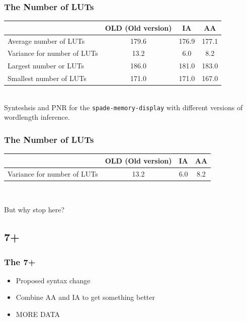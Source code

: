 \documentclass{beamer}
\begin{document}
\begin{frame}[containsverbatim]
\footnotesize
\frametitle{The Number of LUTs}
\begin{table}[h!]
\begin{center}
\begin{tabular}{l | c c c}
  & OLD (Old version) & IA & AA \\
\hline
Average number of LUTs&179.6&176.9 & 177.1 \\
Variance for number of LUTs &13.2&6.0&8.2 \\
Largest number or LUTs&186.0&181.0&183.0 \\
Smallest number of LUTs&171.0&171.0&167.0 \\
\end{tabular}\\[2em]
Synteshsis and PNR for the \verb`spade-memory-display` with different versions of wordlength inference.
\end{center}
\end{table}
\end{frame}

\begin{frame}[containsverbatim]
\footnotesize
\frametitle{The Number of LUTs}
\begin{table}[h!]
\begin{center}
\begin{tabular}{l | c c c}
  & OLD (Old version) & IA & AA \\
\hline
Variance for number of LUTs &13.2&6.0&8.2 \\
\end{tabular}\\[2em]
\end{center}
\end{table}
\end{frame}

\begin{frame}
\begin{center}
\LARGE But why stop here?
\end{center}
\end{frame}

\subsection{7+}

\begin{frame}
\frametitle{The 7+}

\begin{itemize}
  \item Proposed syntax change
  \item Combine AA and IA to get something better
  \item MORE DATA
\end{itemize}
\end{frame}
\end{document}
